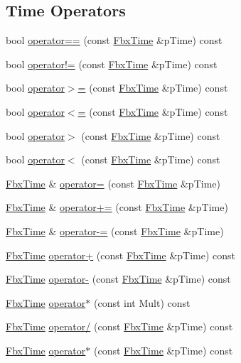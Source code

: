 \subsection*{Time Operators}
\begin{DoxyCompactItemize}
\item 
bool \hyperlink{class_fbx_time_a9dae81e92ed8d293c22d0d09cc0d3ecc}{operator==} (const \hyperlink{class_fbx_time}{Fbx\+Time} \&p\+Time) const
\item 
bool \hyperlink{class_fbx_time_a13ccb17d3a4dfd3bcc9e9272d8a5c853}{operator!=} (const \hyperlink{class_fbx_time}{Fbx\+Time} \&p\+Time) const
\item 
bool \hyperlink{class_fbx_time_a58d0eaca01e27c24c35026c9329bf892}{operator$>$=} (const \hyperlink{class_fbx_time}{Fbx\+Time} \&p\+Time) const
\item 
bool \hyperlink{class_fbx_time_a8d3937138e25178f4a4308e1d192620b}{operator$<$=} (const \hyperlink{class_fbx_time}{Fbx\+Time} \&p\+Time) const
\item 
bool \hyperlink{class_fbx_time_a0cce77e50858f177fa1c11556277010e}{operator$>$} (const \hyperlink{class_fbx_time}{Fbx\+Time} \&p\+Time) const
\item 
bool \hyperlink{class_fbx_time_afb7a54c305cd31c35bb0d7f26a86b647}{operator$<$} (const \hyperlink{class_fbx_time}{Fbx\+Time} \&p\+Time) const
\item 
\hyperlink{class_fbx_time}{Fbx\+Time} \& \hyperlink{class_fbx_time_aeef6e0d32d6a33499cf8a8c87723115b}{operator=} (const \hyperlink{class_fbx_time}{Fbx\+Time} \&p\+Time)
\item 
\hyperlink{class_fbx_time}{Fbx\+Time} \& \hyperlink{class_fbx_time_ac65f799bcf861bc3ace76e7feabd6043}{operator+=} (const \hyperlink{class_fbx_time}{Fbx\+Time} \&p\+Time)
\item 
\hyperlink{class_fbx_time}{Fbx\+Time} \& \hyperlink{class_fbx_time_a66c56bd9467f4480dff65b0686593f8f}{operator-\/=} (const \hyperlink{class_fbx_time}{Fbx\+Time} \&p\+Time)
\item 
\hyperlink{class_fbx_time}{Fbx\+Time} \hyperlink{class_fbx_time_a42823b945fc1ccbd550df5a2b1768ca9}{operator+} (const \hyperlink{class_fbx_time}{Fbx\+Time} \&p\+Time) const
\item 
\hyperlink{class_fbx_time}{Fbx\+Time} \hyperlink{class_fbx_time_aea722074dbc93c423fa5b83420f87611}{operator-\/} (const \hyperlink{class_fbx_time}{Fbx\+Time} \&p\+Time) const
\item 
\hyperlink{class_fbx_time}{Fbx\+Time} \hyperlink{class_fbx_time_a5d1dae17adc48edd0e3149a11777ddbb}{operator$\ast$} (const int Mult) const
\item 
\hyperlink{class_fbx_time}{Fbx\+Time} \hyperlink{class_fbx_time_ad135636b4c52caa325aa174650f33bc0}{operator/} (const \hyperlink{class_fbx_time}{Fbx\+Time} \&p\+Time) const
\item 
\hyperlink{class_fbx_time}{Fbx\+Time} \hyperlink{class_fbx_time_a43c5cf2a3f56dd7d2aab96b45a5473b7}{operator$\ast$} (const \hyperlink{class_fbx_time}{Fbx\+Time} \&p\+Time) const
\end{DoxyCompactItemize}


